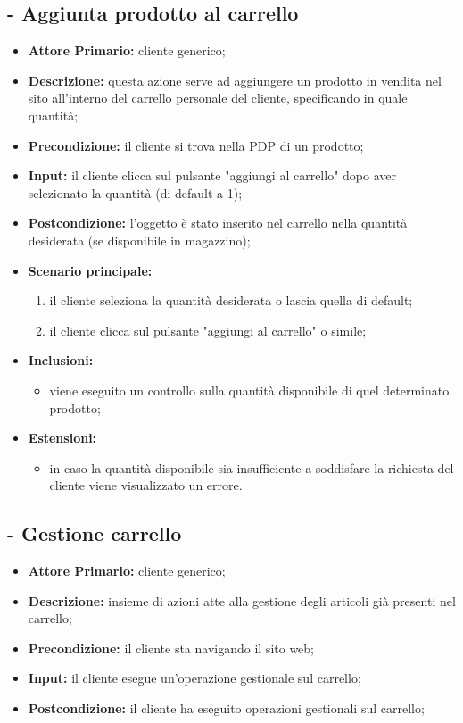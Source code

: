 \subsection{ - Aggiunta prodotto al carrello}
\begin{itemize}
    \item \textbf{Attore Primario:} cliente generico;
    \item \textbf{Descrizione:} questa azione serve ad aggiungere un prodotto in vendita nel sito
          all'interno del carrello personale del cliente, specificando in quale quantità;
    \item \textbf{Precondizione:} il cliente si trova nella PDP di un prodotto;
    \item \textbf{Input:} il cliente clicca sul pulsante "aggiungi al carrello" dopo aver selezionato la quantità (di default a 1);
    \item \textbf{Postcondizione:} l'oggetto è stato inserito nel carrello nella quantità desiderata (se disponibile in magazzino);
    \item \textbf{Scenario principale:}
          \begin{enumerate}
              \item il cliente seleziona la quantità desiderata o lascia quella di default;
              \item il cliente clicca sul pulsante "aggiungi al carrello" o simile;
          \end{enumerate}
    \item \textbf{Inclusioni:}
          \begin{itemize}
              \item viene eseguito un controllo sulla quantità disponibile di quel determinato prodotto;
          \end{itemize}
    \item \textbf{Estensioni:}
          \begin{itemize}
              \item in caso la quantità disponibile sia insufficiente a soddisfare la richiesta del cliente viene visualizzato un errore.
          \end{itemize}
\end{itemize}

\stepUserCase
\subsection{ - Gestione carrello}
\begin{itemize}
    \item \textbf{Attore Primario:} cliente generico;
    \item \textbf{Descrizione:} insieme di azioni atte alla gestione degli articoli già presenti nel carrello;
    \item \textbf{Precondizione:} il cliente sta navigando il sito web;
    \item \textbf{Input:} il cliente esegue un'operazione gestionale sul carrello;
    \item \textbf{Postcondizione:} il cliente ha eseguito operazioni gestionali sul carrello;
\end{itemize}


